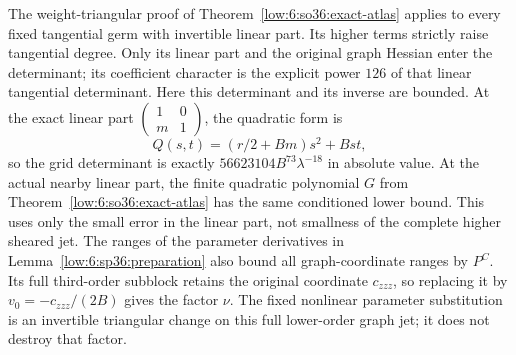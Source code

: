 \documentclass[11pt]{amsart}
\theoremstyle{definition}
\theoremstyle{remark}
\numberwithin{equation}{section}
\begin{document}
The weight-triangular proof of Theorem~\ref{low:6:so36:exact-atlas} applies to every fixed tangential germ with invertible linear part. Its higher terms strictly raise tangential degree. Only its linear part and the original graph Hessian enter the determinant; its coefficient character is the explicit power $126$ of that linear tangential determinant. Here this determinant and its inverse are bounded. At the exact linear part $\left(\begin{smallmatrix}1&0\\m&1\end{smallmatrix}\right)$, the quadratic form is
\[
Q(s,t)=(r/2+Bm)s^2+Bst,
\]
so the grid determinant is exactly $56623104B^{73}\lambda^{-18}$ in absolute value. At the actual nearby linear part, the finite quadratic polynomial $G$ from Theorem~\ref{low:6:so36:exact-atlas} has the same conditioned lower bound. This uses only the small error in the linear part, not smallness of the complete higher sheared jet. The ranges of the parameter derivatives in Lemma~\ref{low:6:sp36:preparation} also bound all graph-coordinate ranges by $P^C$. Its full third-order subblock retains the original coordinate $c_{zzz}$, so replacing it by $v_0=-c_{zzz}/(2B)$ gives the factor $\nu$. The fixed nonlinear parameter substitution is an invertible triangular change on this full lower-order graph jet; it does not destroy that factor.
\end{document}

